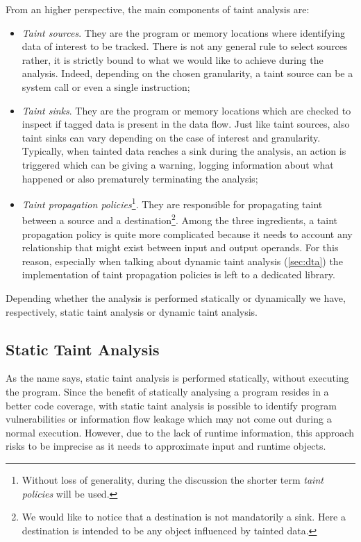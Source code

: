 \documentclass[LaM,binding=0.6cm]{sapthesis}
\begin{document}
From an higher perspective, the main components of taint analysis are: 
\begin{itemize}
\item \textit{Taint sources}. They are the program or memory locations where identifying data of interest to be tracked. There is not any general rule to select sources rather, it is strictly bound to what we would like to achieve during the analysis. Indeed, depending on the chosen granularity, a taint source can be a system call or even a single instruction;
\item \textit{Taint sinks}. They are the program or memory locations which are checked to inspect if tagged data is present in the data flow. Just like taint sources, also taint sinks can vary depending on the case of interest and granularity. Typically, when tainted data reaches a sink during the analysis, an action is triggered which can be giving a warning, logging information about what happened or also prematurely terminating the analysis;
\item \textit{Taint propagation policies}\footnote{Without loss of generality, during the discussion the shorter term \textit{taint policies} will be used.}. They are responsible for propagating taint between a source and a destination\footnote{We would like to notice that a destination is not mandatorily a sink. Here a destination is intended to be any object influenced by tainted data.}. Among the three ingredients, a taint propagation policy is quite more complicated because it needs to account any relationship that might exist between input and output operands. For this reason, especially when talking about dynamic taint analysis (\autoref{sec:dta}) the implementation of taint propagation policies is left to a dedicated library.
\end{itemize}
Depending whether the analysis is performed statically or dynamically we have, respectively, static taint analysis or dynamic taint analysis.

\subsection{Static Taint Analysis}
As the name says, static taint analysis is performed statically, without executing the program. Since the benefit of statically analysing a program resides in a better code coverage, with static taint analysis is possible to identify program vulnerabilities or information flow leakage which may not come out during a normal execution. However, due to the lack of runtime information, this approach risks to be imprecise as it needs to approximate input and runtime objects\cite{arzt2014flowdroid}.
\end{document}
